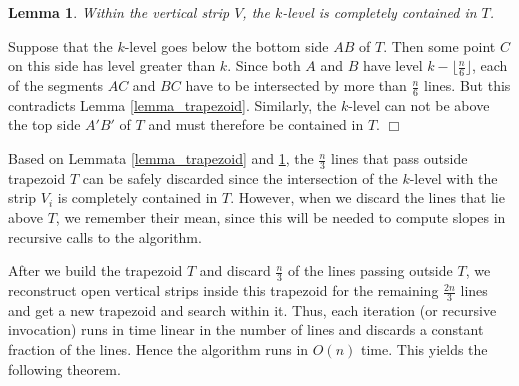 \documentclass{elsart}
\newtheorem{lemma}{Lemma}
\newenvironment{proof}{{\bf Proof:} \rm}{\hfill $\Box$ \medskip\\}
\newcommand{\comment}[1]{}
\begin{document}
\begin{lemma}\label{lemma_trapezoid_containment}
Within the vertical strip $V$, the $k$-level is completely contained
in $T$. 
\end{lemma}

\begin{proof}
Suppose that the $k$-level goes below the bottom side $AB$ of $T$. Then
some point $C$ on this side has level greater than $k$. Since both
$A$ and $B$ have level $k - \lfloor\frac{n}{6}\rfloor$, each of the
segments $AC$ and $BC$ have to be intersected by more than
$\frac{n}{6}$ lines. But this contradicts Lemma \ref{lemma_trapezoid}.
Similarly, the $k$-level can not be above the top side $A'B'$ of $T$
and must therefore be contained in $T$.
\end{proof}

Based on Lemmata \ref{lemma_trapezoid} and
\ref{lemma_trapezoid_containment}, the $\frac{n}{3}$ lines that pass
outside trapezoid $T$ can be safely discarded since the intersection
of the $k$-level with the strip $V_i$ is completely contained in $T$.
However, when we discard the lines that lie above $T$, we remember
their mean, since this will be needed to compute slopes in recursive
calls to the algorithm.

\comment{
It may be observed that until recently in our discussion, we were trying to find the vertex on the boundary of the dual of the $k$-zonoid at which line $p_1^*$ becomes a tangent. But above we show that it is the $k$-level that lies completely inside the trapezoid $T$ and the vertex point is being searched for on the $k$-level, not on the boundary of the dual of the $k$-zonoid. This is because, 
\begin{enumerate}
\item we do not explicitly construct the $k$-zonoid in the dual,
\item each vertex on the boundary of the dual of the $k$-zonoid is calculated by taking the mean of the $k$ lines above a $k$-level vertex,
\item even though we disregard lines above and passing outside the trapezoid $T$, their equations can be associated with each $k$-level vertex and the corresponding $k$-zonoid dual vertex be computed, as need arises.  
\end{enumerate}
}

After we build the trapezoid $T$ and discard $\frac{n}{3}$ of the
lines passing outside $T$, we reconstruct open vertical strips inside
this trapezoid for the remaining $\frac{2n}{3}$ lines and get a new
trapezoid and search within it. Thus, each iteration (or recursive
invocation) runs in time linear in the number of lines and discards a
constant fraction of the lines. Hence the algorithm runs in $O(n)$
time. This yields the following theorem.
\end{document}
